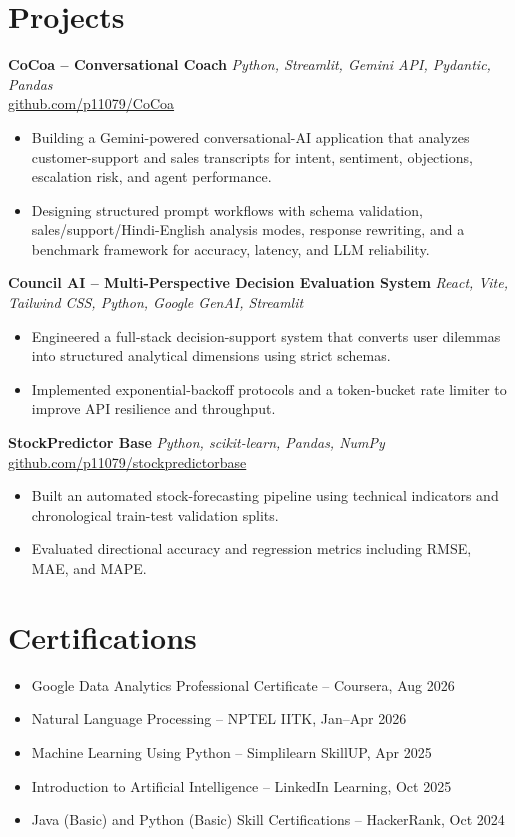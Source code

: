 \documentclass[10pt,a4paper]{article}
\newcommand{\project}[3]{\textbf{#1} \hfill \textit{#2}\\[-1pt]{\small #3}\par}
\begin{document}
\section*{Projects}
\project{CoCoa -- Conversational Coach}{Python, Streamlit, Gemini API, Pydantic, Pandas}{\href{https://github.com/p11079/CoCoa}{github.com/p11079/CoCoa}}
\begin{itemize}
    \item Building a Gemini-powered conversational-AI application that analyzes customer-support and sales transcripts for intent, sentiment, objections, escalation risk, and agent performance.
    \item Designing structured prompt workflows with schema validation, sales/support/Hindi-English analysis modes, response rewriting, and a benchmark framework for accuracy, latency, and LLM reliability.
\end{itemize}

\project{Council AI -- Multi-Perspective Decision Evaluation System}{React, Vite, Tailwind CSS, Python, Google GenAI, Streamlit}{ }
\begin{itemize}
    \item Engineered a full-stack decision-support system that converts user dilemmas into structured analytical dimensions using strict schemas.
    \item Implemented exponential-backoff protocols and a token-bucket rate limiter to improve API resilience and throughput.
\end{itemize}

\project{StockPredictor Base}{Python, scikit-learn, Pandas, NumPy}{\href{https://github.com/p11079/stockpredictorbase}{github.com/p11079/stockpredictorbase}}
\begin{itemize}
    \item Built an automated stock-forecasting pipeline using technical indicators and chronological train-test validation splits.
    \item Evaluated directional accuracy and regression metrics including RMSE, MAE, and MAPE.
\end{itemize}

\section*{Certifications}
\begin{itemize}
    \item Google Data Analytics Professional Certificate -- Coursera, Aug 2026
    \item Natural Language Processing -- NPTEL IITK, Jan--Apr 2026
    \item Machine Learning Using Python -- Simplilearn SkillUP, Apr 2025
    \item Introduction to Artificial Intelligence -- LinkedIn Learning, Oct 2025
    \item Java (Basic) and Python (Basic) Skill Certifications -- HackerRank, Oct 2024
\end{itemize}
\end{document}
